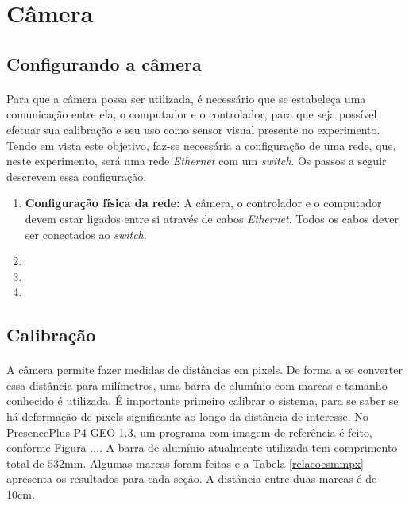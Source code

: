 \documentclass[a4paper,11pt]{scrartcl} %
\numberwithin{equation}{section} %
\numberwithin{figure}{section} %
\numberwithin{table}{section} %
\begin{document}
\section{Câmera}
\subsection{Configurando a câmera}
\paragraph{} Para que a câmera possa ser utilizada, é necessário que se estabeleça uma comunicação entre ela, o computador e o controlador, para que seja possível efetuar sua calibração e seu uso como sensor visual presente no experimento. Tendo em vista este objetivo, faz-se necessária a configuração de uma rede, que, neste experimento, será uma rede \textit{Ethernet} com um \textit{switch}. Os passos a seguir descrevem essa configuração.
\begin {enumerate}
  \item \textbf{Configuração física da rede: } A câmera, o controlador e o computador devem estar ligados entre si através de cabos \textit{Ethernet}. Todos os cabos dever ser conectados ao \textit{switch}.
  \item 
  \item
  \item 
\end{enumerate}

\subsection{Calibração}
\paragraph{} A câmera permite fazer medidas de distâncias em pixels. De forma a se converter essa distância para milímetros, uma barra de alumínio com marcas e tamanho conhecido é utilizada. É importante primeiro calibrar o sistema, para se saber se há deformação de pixels significante ao longo da distância de interesse. No PresencePlus P4 GEO 1.3, um programa com imagem de referência é feito, conforme Figura .... A barra de alumínio atualmente utilizada tem comprimento total de $532$mm. Algumas marcas foram feitas e a Tabela \ref{relacoesmmpx} apresenta os resultados para cada seção. A distância entre duas marcas é de 10cm.
\end{document}

